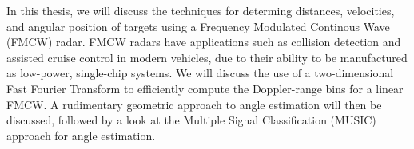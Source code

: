In this thesis, we will discuss the
techniques for determing distances, velocities, and angular position of targets
using a Frequency Modulated Continous Wave (FMCW) radar. FMCW radars have
applications such as collision detection and assisted
cruise control in modern vehicles, due to their ability to be manufactured as
low-power, single-chip systems. We will discuss the use of a two-dimensional
Fast Fourier Transform to efficiently compute the Doppler-range bins for a
linear FMCW. A rudimentary geometric approach to angle estimation will then be
discussed, followed by a look at the Multiple Signal Classification (MUSIC)
approach for angle estimation.

